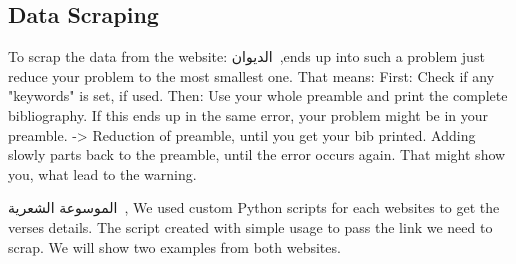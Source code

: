 \subsection{Data Scraping}\label{sec:Data_Scrap}
To scrap the data from the website: \textarabic{الديوان}~\cite{diwan},ends up into such a problem just reduce your problem to the most smallest one. That means: First: Check if any "keywords" is set, if used. Then: Use your whole preamble and print the complete bibliography. If this ends up in the same error, your problem might be in your preamble. -> Reduction of preamble, until you get your bib printed. Adding slowly parts back to the preamble, until the error occurs again. That might show you, what lead to the warning.

\textarabic{الموسوعة الشعرية}~\cite{PoetryEncyclopedia2016}, We used custom Python scripts for each websites to get the verses details. The script created with simple usage to pass the link we need to scrap. We will show two examples from both websites.
